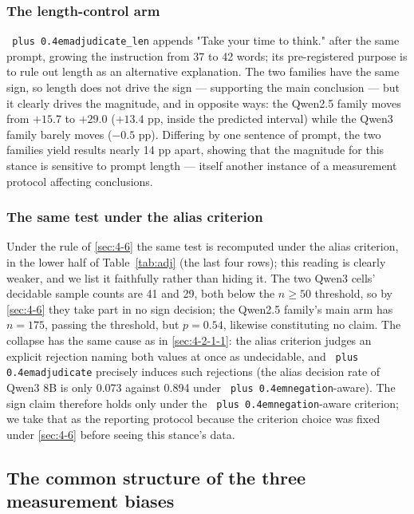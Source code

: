 \documentclass[pdflatex,sn-basic,Numbered]{sn-jnl}
\theoremstyle{thmstyleone}
\theoremstyle{thmstyletwo}
\theoremstyle{thmstylethree}
\DeclareRobustCommand{\code}[1]{\texttt{\spaceskip=0pt plus 0.4em\relax#1}}
\begin{document}
\subsubsection{The length-control arm}
\label{sec:4-9-4}

\code{adjudicate\_len} appends "Take your time to think." after the same prompt, growing the
instruction from 37 to 42 words; its pre-registered purpose is to rule out length as an
alternative explanation. The two families have the same sign, so length does not drive the
sign — supporting the main conclusion — but it clearly drives the magnitude, and in opposite
ways: the Qwen2.5 family moves from $+15.7$ to $+29.0$ ($+13.4$ pp, inside the predicted
interval) while the Qwen3 family barely moves ($-0.5$ pp). Differing by one sentence of prompt,
the two families yield results nearly 14 pp apart, showing that the magnitude for this stance
is sensitive to prompt length — itself another instance of a measurement protocol affecting
conclusions.

\subsubsection{The same test under the alias criterion}
\label{sec:4-9-5}

Under the rule of \ref{sec:4-6} the same test is recomputed under the alias criterion, in the lower half
of Table~\ref{tab:adj} (the last four rows); this reading is clearly weaker, and we list it
faithfully rather than hiding it. The two Qwen3 cells' decidable sample counts are 41 and 29,
both below the $n\ge50$ threshold, so by \ref{sec:4-6} they take part in no sign decision; the Qwen2.5
family's main arm has $n=175$, passing the threshold, but $p=0.54$, likewise constituting no
claim. The collapse has the same cause as in \ref{sec:4-2-1-1}: the alias criterion judges an explicit
rejection naming both values at once as undecidable, and \code{adjudicate} precisely induces such
rejections (the alias decision rate of Qwen3 8B is only 0.073 against 0.894 under
\code{negation}-aware). The sign claim therefore holds only under the \code{negation}-aware criterion; we take
that as the reporting protocol because the criterion choice was fixed under \ref{sec:4-6} before seeing
this stance's data.

\subsection{The common structure of the three measurement biases}
\label{sec:4-10}
\end{document}
